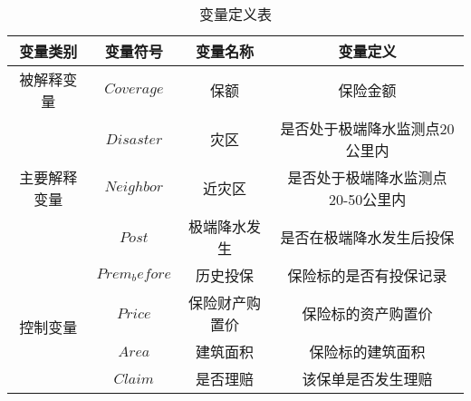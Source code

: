 \begin{table}[H]
    \caption{变量定义表}\label{tab:var}
    \begin{tabular}{@{}|c|c|c|c|@{}}
        \toprule
        变量类别                    & 变量符号        & 变量名称    & 变量定义              \\ \midrule
        被解释变量                   & $Coverage$    & 保额      & 保险金额    \\ \midrule
        \multirow{3}{*}{主要解释变量} & $Disaster$    & 灾区      & 是否处于极端降水监测点20公里内    \\ \cmidrule(l){2-4}
                                & $Neighbor$    & 近灾区     & 是否处于极端降水监测点20-50公里内 \\ \cmidrule(l){2-4}
                                & $Post$        & 极端降水发生    &  是否在极端降水发生后投保                 \\ \midrule
        \multirow{4}{*}{控制变量}   & $Prem_before$ & 历史投保    & 保险标的是否有投保记录        \\ \cmidrule(l){2-4}
                                & $Price$       & 保险财产购置价 & 保险标的资产购置价            \\ \cmidrule(l){2-4}
                                & $Area$        & 建筑面积    & 保险标的建筑面积                  \\ \cmidrule(l){2-4}
                                & $Claim$       & 是否理赔    & 该保单是否发生理赔            \\ \bottomrule
    \end{tabular}
\end{table}
